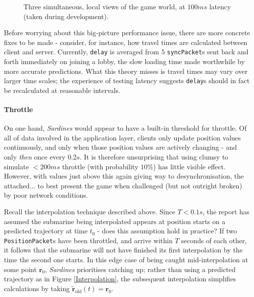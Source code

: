 \documentclass[a4paper, 10pt]{article}
\begin{document}
\begin{flushleft}
\begin{figure}[h]
\centering
\caption{Three simultaneous, local views of the game world, at $100ms$ latency (taken during development).}
\label{Lag Testing}
\end{figure}

Before worrying about this big-picture performance issue, there are more concrete fixes to be made - consider, for instance, how travel times are calculated between client and server. Currently, \texttt{delay} is averaged from $5$ \texttt{syncPacket}s sent back and forth immediately on joining a lobby, the slow loading time made worthwhile by more accurate predictions. What this theory misses is travel times may vary over larger time scales; the experience of testing latency suggests \texttt{delay}s should in fact be recalculated at reasonable intervals. %

\paragraph{Throttle} On one hand, \textit{Sardines} would appear to have a built-in threshold for throttle. Of all of data involved in the application layer, clients only update position values continuously, and only when those position values are actively changing - and only \textit{then} once every $0.2s$. It is therefore unsurprising that using clumsy to simulate $<200ms$ throttle (with probability $10\%$) has little visible effect. However, with values just above this again giving way to desynchronisation, the attached... to best present the game when challenged (but not outright broken) by poor network conditions.%



\vspace{5pt}\noindent
Recall the interpolation technique described above. Since $T < 0.1s$, the report has assumed the submarine being interpolated appears at position starts on a predicted trajectory at time $t_0$ - does this assumption hold in practice? If two \texttt{PositionPacket}s have been throttled, and arrive within $T$ seconds of each other, it follows that the submarine will not have finished its first interpolation by the time the second one starts. In this edge case of being caught mid-interpolation at some point $\mathbf{r}_0$, \textit{Sardines} prioritises catching up; rather than using a predicted trajectory as in Figure \ref{Interpolation}, the subsequent interpolation simplifies calculations by taking $\mathbf{\tilde{r}}_{\textrm{old}}(t) = \mathbf{r}_0$.


\end{flushleft}
\end{document}
